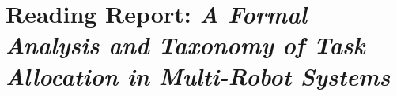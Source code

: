 




    \newpage

    \section{Reading Report: \emph{A Formal Analysis and Taxonomy of Task Allocation in Multi-Robot Systems
    }}
    \cite{Gerkey2004}
    
